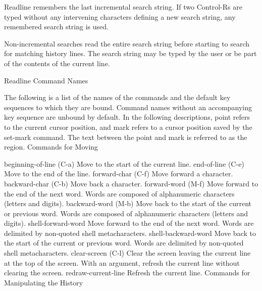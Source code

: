 \documentclass[11pt]{article}
\begin{document}
{{{Readline remembers the last incremental search string. If two Control-Rs are typed without any intervening characters defining a new search string, any remembered search string is used.

Non-incremental searches read the entire search string before starting to search for matching history lines. The search string may be typed by the user or be part of the contents of the current line.

Readline Command Names

The following is a list of the names of the commands and the default key sequences to which they are bound. Command names without an accompanying key sequence are unbound by default. In the following descriptions, point refers to the current cursor position, and mark refers to a cursor position saved by the set-mark command. The text between the point and mark is referred to as the region.
Commands for Moving

beginning-of-line (C-a)
Move to the start of the current line.
end-of-line (C-e)
Move to the end of the line.
forward-char (C-f)
Move forward a character.
backward-char (C-b)
Move back a character.
forward-word (M-f)
Move forward to the end of the next word. Words are composed of alphanumeric characters (letters and digits).
backward-word (M-b)
Move back to the start of the current or previous word. Words are composed of alphanumeric characters (letters and digits).
shell-forward-word
Move forward to the end of the next word. Words are delimited by non-quoted shell metacharacters.
shell-backward-word
Move back to the start of the current or previous word. Words are delimited by non-quoted shell metacharacters.
clear-screen (C-l)
Clear the screen leaving the current line at the top of the screen. With an argument, refresh the current line without clearing the screen.
redraw-current-line
Refresh the current line.
Commands for Manipulating the History

}}}
\end{document}
